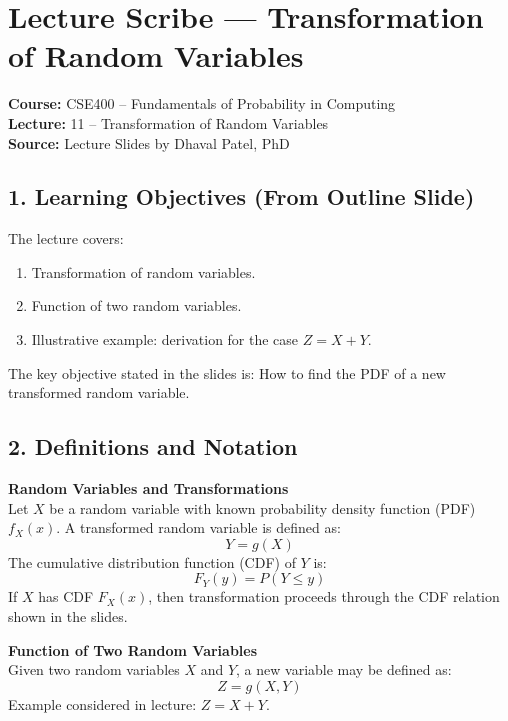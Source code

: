 \documentclass[11pt]{article}
\begin{document}
\section*{Lecture Scribe --- Transformation of Random Variables}
\textbf{Course:} CSE400 – Fundamentals of Probability in Computing \\
\textbf{Lecture:} 11 – Transformation of Random Variables \\
\textbf{Source:} Lecture Slides by Dhaval Patel, PhD

\subsection*{1. Learning Objectives (From Outline Slide)}
The lecture covers:
\begin{enumerate}[noitemsep]
    \item Transformation of random variables.
    \item Function of two random variables.
    \item Illustrative example: derivation for the case $Z=X+Y$.
\end{enumerate}
The key objective stated in the slides is: How to find the PDF of a new transformed random variable.

\subsection*{2. Definitions and Notation}
\textbf{Random Variables and Transformations} \\
Let $X$ be a random variable with known probability density function (PDF) $f_X(x)$. A transformed random variable is defined as:
\begin{equation}
    Y = g(X)
\end{equation}
The cumulative distribution function (CDF) of $Y$ is:
\begin{equation}
    F_Y(y) = P(Y \leq y)
\end{equation}
If $X$ has CDF $F_X(x)$, then transformation proceeds through the CDF relation shown in the slides.

\textbf{Function of Two Random Variables} \\
Given two random variables $X$ and $Y$, a new variable may be defined as:
\begin{equation}
    Z = g(X, Y)
\end{equation}
Example considered in lecture: $Z = X + Y$.
\end{document}
